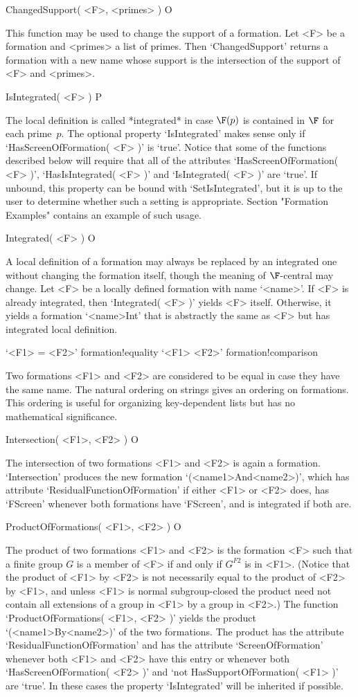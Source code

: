 \> ChangedSupport( <F>, <primes> ) O

This function may be used to change the support of a formation. Let <F>
be a formation and <primes> a list of primes. Then `ChangedSupport'
returns a formation with a new name whose support is the intersection 
of the support of <F> and <primes>.

\> IsIntegrated( <F> ) P

The local definition  is called *integrated* in case $\F(p)$ is contained in
$\F$  for each  prime~$p$. The optional property `IsIntegrated' makes sense only if `HasScreenOfFormation( <F> )' is `true'. Notice that
some of the functions described below will require that all of the attributes `HasScreenOfFormation(
<F> )', `HasIsIntegrated( <F> )' and `IsIntegrated( <F> )' are `true'. If
unbound, this property can be bound with `SetIsIntegrated', but it is up to the
user to determine whether such a setting is appropriate.
Section "Formation Examples" contains an example of such usage.

\> Integrated( <F> )  O

A local definition of a formation may always be replaced by an
integrated one without changing the formation itself, though the meaning
of ${\F}$-central may change.  Let <F> be a locally defined {\GAP} formation with
name `<name>'.  If <F> is already integrated, then `Integrated( <F> )' 
yields <F> itself. Otherwise, it yields a  formation `<name>Int' that is
abstractly the same as <F> but has integrated local definition.

\> `<F1> = <F2>' {formation!equality}
\> `<F1> \< <F2>' {formation!comparison}

Two {\GAP} formations <F1> and <F2> are considered to be equal in case they 
have the same name. The natural ordering on strings gives an ordering 
on formations. This ordering is useful for organizing key-dependent 
lists but has no mathematical significance.

\> Intersection( <F1>, <F2> ) O

The intersection of two {\GAP} formations <F1> and 
<F2> is again a formation. `Intersection' produces the new formation
`(<name1>And<name2>)', which has attribute `ResidualFunctionOfFormation' if
either <F1> or <F2> does, has `FScreen' whenever both formations have `FScreen', and is
integrated if both are. 

\> ProductOfFormations( <F1>, <F2> ) O

The product of two  formations <F1> and <F2> is the formation <F>
such that a finite group $G$ is a member of <F> if and only if
$G^{F2}$ is in <F1>. (Notice that the product of <F1> by <F2> is 
not necessarily equal to the product of <F2> by <F1>, and unless <F1> is normal subgroup-closed the product need not contain all extensions of a group in <F1> by a group in <F2>.) The function 
`ProductOfFormations( <F1>, <F2> )' yields the product `(<name1>By<name2>)' of the two  
formations. The product has the attribute `ResidualFunctionOfFormation' and has
the attribute  `ScreenOfFormation' whenever both <F1> and <F2> have this entry
or whenever both `HasScreenOfFormation( <F2> )' and `not HasSupportOfFormation(
<F1> )' are `true'. In these cases the property `IsIntegrated' will be inherited
if possible. 
